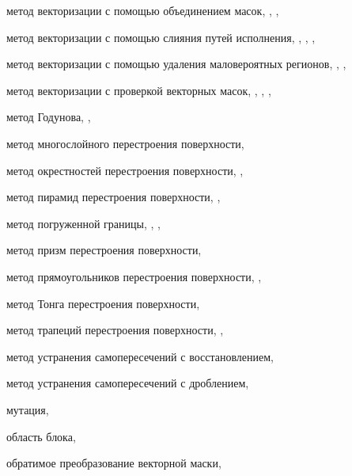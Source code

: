 метод векторизации с помощью объединением масок, \pageref{term:meth_vec_union}, \pageref{term:meth_vec_union2}, \pageref{term:meth_vec_union3}

метод векторизации с помощью слияния путей исполнения, \pageref{term:meth_vec_merge}, \pageref{term:meth_vec_merge2}, \pageref{term:meth_vec_merge3}, \pageref{term:meth_vec_merge4}

метод векторизации с помощью удаления маловероятных регионов, \pageref{term:meth_vec_del_low_prob_regions}, \pageref{term:meth_vec_del_low_prob_regions2}, \pageref{term:meth_vec_del_low_prob_regions3}

метод векторизации с проверкой векторных масок, \pageref{term:meth_vec_check}, \pageref{term:meth_vec_check2}, \pageref{term:meth_vec_check3}, \pageref{term:meth_vec_check4}

метод Годунова, \pageref{term:godunov_method}, \pageref{term:godunov_method2}

метод многослойного перестроения поверхности, \pageref{term:method_remesh_multi}

метод окрестностей перестроения поверхности, \pageref{term:method_remesh_okr}, \pageref{term:method_remesh_okr2}

метод пирамид перестроения поверхности, \pageref{term:method_remesh_pyramid}, \pageref{term:method_remesh_pyramid2}

метод погруженной границы, \pageref{term:immersed_boundary_method}, \pageref{term:immersed_boundary_method2}, \pageref{term:immersed_boundary_method3}

метод призм перестроения поверхности, \pageref{term:method_remesh_prism}

метод прямоугольников перестроения поверхности, \pageref{term:method_remesh_rect}, \pageref{term:method_remesh_rect2}

метод Тонга перестроения поверхности, \pageref{term:method_remesh_tong}

метод трапеций перестроения поверхности, \pageref{term:method_remesh_trap}, \pageref{term:method_remesh_trap2}

метод устранения самопересечений с восстановлением, \pageref{term:method_selfint_repare}

метод устранения самопересечений с дроблением, \pageref{term:method_selfint_cut}

мутация, \pageref{term:mutation}

область блока, \pageref{term:block_scope}

обратимое преобразование векторной маски, \pageref{term:obratim_preobr}

